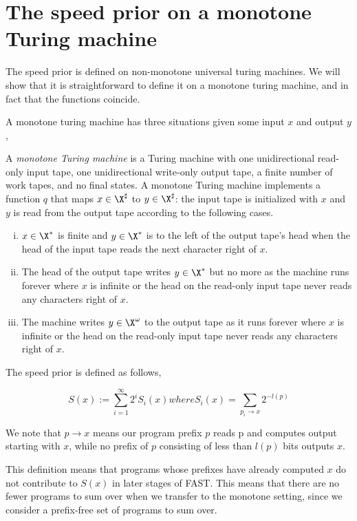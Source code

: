 \section{The speed prior on a monotone Turing machine}

The speed prior is defined on non-monotone universal turing machines. We will show that it is straightforward to define it on a monotone turing machine, and in fact that the functions coincide. 

A monotone turing machine has three situations given some input $x$ and output $y$,


\begin{definition}
\label{def:monotone-TM}
A \emph{monotone Turing machine}
is a Turing machine with
one unidirectional read-only input tape,
one unidirectional write-only output tape,
a finite number of work tapes, and no final states.
A monotone Turing machine implements a function $q$
that maps $x \in \X^\sharp$ to $y \in \X^\sharp$:
the input tape is initialized with $x$
and $y$ is read from the output tape according to the following cases.
\begin{enumerate}[(i)]
\item $x \in \X^*$ is finite and
	$y \in \X^*$ is to the left of the output tape's head when
	the head of the input tape reads the next character right of $x$.
\item The head of the output tape writes $y \in \X^*$ but no more
	as the machine runs forever where
	$x$ is infinite or
	the head on the read-only input tape never reads any characters right of $x$.
\item The machine writes $y \in \X^\omega$ to the output tape
	as it runs forever where
	$x$ is infinite or
	the head on the read-only input tape never reads any characters right of $x$.
\end{enumerate}
\end{definition}

The speed prior is defined as follows, 

$$ S(x) := \sum_{i=1}^\infty 2^i S_i(x) where S_i(x) = \sum_{p_i \rightarrow x} 2^{-l(p)}$$

We note that $p\rightarrow x$ means our program prefix $p$ reads p and computes output starting with $x$, while no prefix of $p$ consisting of less than $l(p)$ bits outputs $x$.

This definition means that programs whose prefixes have already computed $x$ do not contribute to $S(x)$ in later stages of FAST. This means that there are no fewer programs to sum over when we transfer to the monotone setting, since we consider a prefix-free set of programs to sum over.

